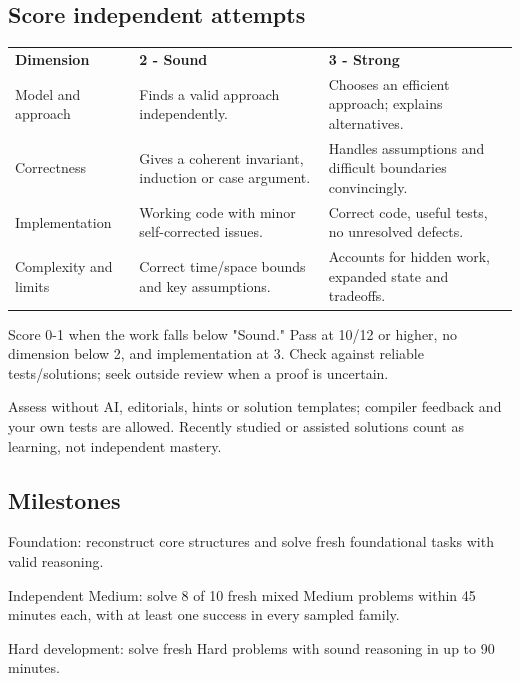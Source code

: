 \documentclass[11pt,letterpaper]{article}
\begin{document}
\subsection*{Score independent attempts}

\begin{center}
\small
\begin{tabular}{>{\raggedright\arraybackslash}p{}>{\raggedright\arraybackslash}p{}>{\raggedright\arraybackslash}p{}}
\textbf{Dimension} & \textbf{2 - Sound} & \textbf{3 - Strong} \\
Model and approach & Finds a valid approach independently. & Chooses an efficient approach; explains alternatives. \\
Correctness & Gives a coherent invariant, induction or case argument. & Handles assumptions and difficult boundaries convincingly. \\
Implementation & Working code with minor self-corrected issues. & Correct code, useful tests, no unresolved defects. \\
Complexity and limits & Correct time/space bounds and key assumptions. & Accounts for hidden work, expanded state and tradeoffs. \\
\end{tabular}
\end{center}

Score 0-1 when the work falls below "Sound." Pass at 10/12 or higher, no dimension below 2, and implementation at 3. Check against reliable tests/solutions; seek outside review when a proof is uncertain.

Assess without AI, editorials, hints or solution templates; compiler feedback and your own tests are allowed. Recently studied or assisted solutions count as learning, not independent mastery.

\subsection*{Milestones}

Foundation: reconstruct core structures and solve fresh foundational tasks with valid reasoning.

Independent Medium: solve 8 of 10 fresh mixed Medium problems within 45 minutes each, with at least one success in every sampled family.

Hard development: solve fresh Hard problems with sound reasoning in up to 90 minutes.
\end{document}

